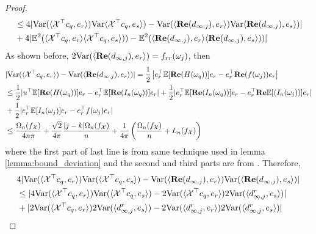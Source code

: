 \begin{proof}
\begin{equation}
\begin{aligned}
&\le 4|\mbox{Var}(\langle \mathcal{\mathcal{X}}^\top   c_q,e_r\rangle)\mbox{Var}{\langle \mathcal{\mathcal{X}}^\top   c_q,e_s\rangle)} - \mbox{Var}(\langle {\bf Re}(d_{\infty, j}),e_r\rangle)\mbox{Var}{\langle {\bf Re}(d_{\infty, j}),e_s\rangle)}| \\
&+ 4|\mathbb{E}^2(\langle \mathcal{\mathcal{X}}^\top   c_q,e_r\rangle \langle \mathcal{\mathcal{X}}^\top  c_q,e_s\rangle) )-\mathbb{E}^2(\langle {\bf Re}(d_{\infty, j}),e_r\rangle \langle {\bf Re}(d_{\infty, j}),e_s\rangle) )|
\end{aligned}
\end{equation}
As shown before, $2\mbox{Var}(\langle {\bf Re}(d_{\infty, j}), e_r\rangle) = f_{rr}(\omega_j)$,  then 
\begin{equation}
\label{eq:help_bound1}
\begin{aligned}
&|\mbox{Var}(\langle \mathcal{X}^\top c_q,e_r\rangle) -  \mbox{Var}(\langle {\bf Re}(d_{\infty, j}),e_r\rangle)| =\frac{1}{2} \left|e_r^\top \mathbb{E}[{\bf Re}(H(\omega_q))]e_r - e_r^\top {\bf Re}(f(\omega_j))e_r\right|\\
& \le \frac{1}{2}|u^\top \mathbb{E}[{\bf Re}(H(\omega_q))]e_r - e_r^\top  \mathbb{E}[{\bf Re}(I_n(\omega_q))]e_r|+\frac{1}{2}|e_r^\top\mathbb{E}[{\bf Re}(I_n(\omega_q))]e_r-e_r^\top  {\bf Re}\mathbb{E}[(I_n(\omega_j))]e_r|\\
&+ \frac{1}{2}|e_r^\top\mathbb{E}[I_n(\omega_j)]e_r - e_r^\top  f(\omega_j)e_r|\\
&\le  \frac{\Omega_n(f_\mathcal{X})}{4n\pi}+\frac{\sqrt{2}}{4\pi}\frac{|j-k|\Omega_n(f_\mathcal{X})}{n}+ \frac{1}{4\pi}\left(\frac{\Omega_n(f_\mathcal{X})}{n} + L_n(f_\mathcal{X})\right)\\
\end{aligned}
\end{equation}
where the first part of last line is from same technique used in lemma \ref{lemma:bound_deviation} and the second and third parts are from \cite{sun2018large}. 
Therefore, 
\begin{equation}
\begin{aligned}
&4|\var(\langle \mathcal{X}^\top  c_q,e_r\rangle)\var({\langle \mathcal{X}^\top   c_q,e_s\rangle)} - \var(\langle {\bf Re}(d_{\infty, j}) ,e_r\rangle)\var(\langle {\bf Re}(d_{\infty, j}), e_s\rangle)| \\
& \le |4\var(\langle \mathcal{X}^\top c_q,e_r\rangle)\var(\langle \mathcal{X}^\top  c_q,e_s\rangle)- 2\var(\langle \mathcal{X}^\top  c_q,e_r\rangle)2\var(\langle d^{r}_{\infty, j},e_s\rangle)| \\
&+|2\var(\langle \mathcal{X}^\top  c_q,e_r\rangle)2\var(\langle d^{r}_{\infty, j},e_s\rangle)- 2\var(\langle d^{r}_{\infty, j},e_r\rangle)2\var(\langle d^{r}_{\infty, j},e_s\rangle)|\\

\end{aligned}
\end{equation}
\end{proof}
